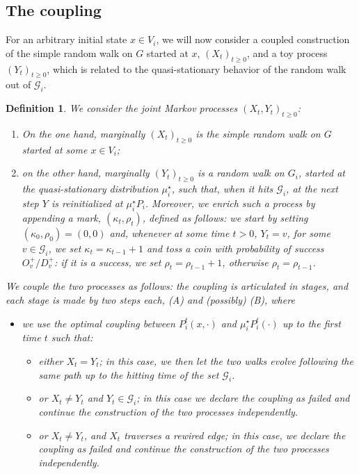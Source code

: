 \documentclass[11pt,oneside]{amsart}
\numberwithin{equation}{section}  %
\theoremstyle{plain}
\newtheorem{definition}[theorem]{Definition}
\newcommand{\gates}{\mathcal{G}}
\newcommand{\muqs}{\mu^\star_i}
\begin{document}
\subsection{The coupling}\label{suse:coupling}
For an arbitrary initial state $x\in V_i$, we will now consider a coupled construction of the simple random walk on $G$ started at $x$, $(X_t)_{t\ge 0}$, and a toy process $(Y_t)_{t\ge0}$, which is related to the quasi-stationary behavior of the random walk out of $\gates_i$.
\begin{definition}\label{def:coupling}
We consider the joint Markov processes $(X_t,Y_t)_{t\ge0}$:
\begin{enumerate}
	\item On the one hand, marginally $(X_t)_{t\ge 0}$ is the simple random walk on $G$ started at some $x\in V_i$;
	\item on the other hand, marginally $(Y_t)_{t\ge 0}$ is a random walk on $G_i$, started at the quasi-stationary distribution $\muqs$, such that, when it hits $\gates_i$, at the next step $Y$ is reinitialized at  $\muqs P_i$.  
	Moreover, we enrich such a process by appending a mark, $(\kappa_t,\rho_t)$, defined as follows: we start by setting $(\kappa_0,\rho_0)=(0,0)$ and, whenever at some time $t>0$, $Y_t=v$, for some $v \in\gates_i$, we set $\kappa_t=\kappa_{t-1}+1$ and toss a coin with probability of success $O_v^+/D_v^+$: if it is a success, we set $\rho_t=\rho_{t-1}+1$, otherwise $\rho_t=\rho_{t-1}$.
\end{enumerate}
We couple the two processes as follows: the coupling is articulated in \emph{stages}, and each stage is made by two steps each, (A) and (possibly) (B), where
\begin{itemize}
	\item[(A)] we use the optimal coupling between $P_i^t(x,\cdot)$ and $\muqs P_i^t(\cdot)$ up to the first time $t$ such that:
	\begin{itemize}
		\item[(i)] either $X_t=Y_t$; in this case, we then let the two walks evolve following the same path up to the hitting time of the set $\gates_i$.
		\item[(ii)] or $X_t\neq Y_t$ and $Y_t\in \gates_i$; in this case we declare the coupling as {\em failed} and continue the construction of the two processes independently.
		\item[(iii)] or $X_{t}\neq Y_{t}$, and $X_t$ traverses a rewired edge; in this case, we declare the coupling as {\em failed} and continue the construction of the two processes independently.

\end{itemize}
\end{itemize}
\end{definition}
\end{document}
